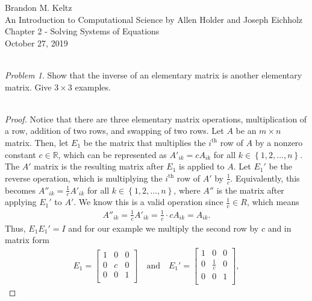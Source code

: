 \documentclass{article}
\begin{document}
	
	\begin{flushleft}	
	
		Brandon M. Keltz\\
		An Introduction to Computational Science by Allen Holder and Joseph Eichholz\\
		Chapter 2 - Solving Systems of Equations\\
		October 27, 2019\\\
		
		\textit{Problem 1}. Show that the inverse of an elementary matrix is another elementary matrix. Give $3 \times 3$ examples. \\\
		
		\begin{proof}
		
			Notice that there are three elementary matrix operations, multiplication of a row, addition of two rows, and swapping of two rows. Let $A$ be an $m \times n$ matrix. Then, let $E_1$ be the matrix that multiplies the $i^\text{th}$ row of $A$ by a nonzero constant $c \in \mathbb{R}$, which can be represented as $A'_{ik} = cA_{ik}$ for all $k \in \left\{ 1, 2, \ldots, n \right\}$. The $A'$ matrix is the resulting matrix after $E_1$ is applied to $A$. Let $E_1'$ be the reverse operation, which is multiplying the $i^\text{th}$ row of $A'$ by $\frac{1}{c}$. Equivalently, this becomes $A''_{ik} = \frac{1}{c} A'_{ik}$ for all $k \in \left\{ 1, 2, \ldots, n \right\}$, where $A''$ is the matrix after applying $E_1'$ to $A'$. We know this is a valid operation since $\frac{1}{c} \in {R}$, which means 
			\begin{align*}
				A''_{ik} = \frac{1}{c} A'_{ik} = \frac{1}{c} \cdot c A_{ik} = A_{ik}.
			\end{align*}	
			Thus, $E_1 E_1' = I$ and for our example we multiply the second row by $c$ and in matrix form
			\begin{align*}
				E_1 = \begin{bmatrix}
					1 & 0 & 0 \\
					0 & c & 0 \\
					0 & 0 & 1 \\
				\end{bmatrix} \quad \text{and} \quad
				E_1' = \begin{bmatrix}
					1 & 0 & 0 \\
					0 & \frac{1}{c} & 0 \\
					0 & 0 & 1 \\
				\end{bmatrix},
			\end{align*}

\end{proof}
\end{flushleft}
\end{document}
